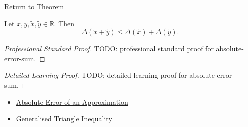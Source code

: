 \newpage
{}
\label{prf:absolute-error-sum}

\begin{remark*}[Return]
\hyperref[thm:absolute-error-sum]{Return to Theorem}
\end{remark*}

\begin{theorem*}
Let $x,y,\widetilde{x},\widetilde{y}\in\mathbb{R}$. Then
\[
  \Delta(\widetilde{x}+\widetilde{y})
  \leq
  \Delta(\widetilde{x})+\Delta(\widetilde{y}).
\]
\end{theorem*}

\begin{proof}[Professional Standard Proof]
\LRAProofBodyStart
TODO: professional standard proof for absolute-error-sum.
\end{proof}

\begin{proof}[Detailed Learning Proof]
\LRAProofBodyStart
TODO: detailed learning proof for absolute-error-sum.
\end{proof}

\begin{remark*}
\end{remark*}

\begin{dependencies}
\begin{itemize}
  \item \hyperref[def:absolute-error-approximation]{Absolute Error of an Approximation}
  \item \hyperref[thm:absolute-value-sum-bound]{Generalised Triangle Inequality}
\end{itemize}
\end{dependencies}

\clearpage
